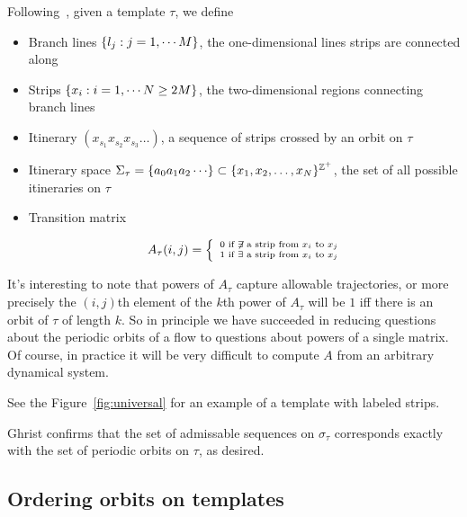\documentclass[paper.tex]{subfiles}
\begin{document}
\begin{definition}
  Following~\cite{knottyode}, given a template $\tau$, we define
  \begin{itemize}
    \item Branch lines  $\{ l_j : j = 1, \cdots M \}$, the one-dimensional lines strips are connected along
    \item Strips $\{ x_i : i = 1, \cdots N \geq 2 M \}$, the two-dimensional regions connecting branch lines
    \item Itinerary $(x_{s_1}x_{s_2}x_{s_3} \dots)$, a sequence of strips crossed by an orbit on $\tau$
    \item Itinerary space $\Sigma_\tau = \set{a_0 a_1 a_2 \cdots} \subset \set{x_1, x_2, \ldots, x_N}^{\Z^+}$, the set of all possible itineraries on $\tau$
    \item Transition matrix

      \begin{equation}
        A_\tau(i,j) = \left\{ \
        \begin{smallmatrix}
          0 \text{ if } \not\exists \text{ a strip from } x_i \text{ to } x_j \\
          1 \text{ if } \exists \text{ a strip from } x_i \text{ to } x_j
        \end{smallmatrix}
        \right.
      \end{equation}
  \end{itemize}
\end{definition}

It's interesting to note that powers of $A_\tau$ capture allowable trajectories, or more precisely the $(i,j)$th element of the $k$th power of $A_\tau$ will be $1$ iff there is an orbit of $\tau$ of length $k$.
So in principle we have succeeded in reducing questions about the periodic orbits of a flow to questions about powers of a single matrix. Of course, in practice it will be very difficult to compute $A$ from an arbitrary
dynamical system.

See the Figure~\ref{fig:universal} for an example of a template with labeled strips.

Ghrist confirms that the set of admissable sequences on $\sigma_\tau$ corresponds exactly with the set of periodic orbits on $\tau$, as desired.


\subsection{Ordering orbits on templates}
\end{document}

